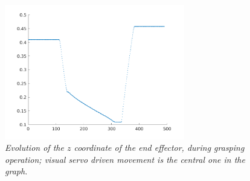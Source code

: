 \begin{figure}
	\centering
	\includegraphics[width=0.7\textwidth]{Images/experimental_data/grasping_z.png}
	\caption{\textit{Evolution of the $z$ coordinate of the end effector, during grasping operation; visual servo driven movement is the central one in the graph.}}
	\label{fig:graspingZ}
\end{figure}






